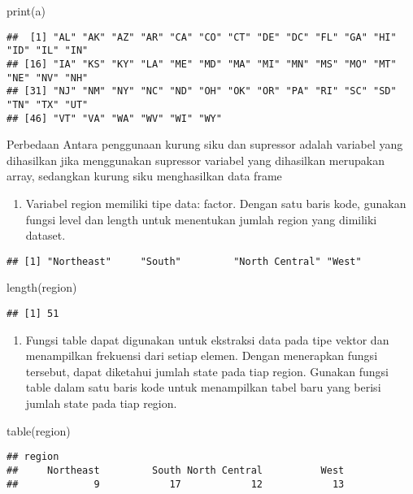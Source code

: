\documentclass[
]{article}
\newenvironment{Shaded}{\begin{snugshade}}{\end{snugshade}}
\newcommand{\FunctionTok}[1]{\textcolor[rgb]{0.00,0.00,0.00}{#1}}
\newcommand{\NormalTok}[1]{#1}
\newcommand{\OtherTok}[1]{\textcolor[rgb]{0.56,0.35,0.01}{#1}}
\newcommand{\SpecialCharTok}[1]{\textcolor[rgb]{0.00,0.00,0.00}{#1}}
\providecommand{\tightlist}{%
  \setlength{\itemsep}{0pt}\setlength{\parskip}{0pt}}
\begin{document}
\begin{Shaded}
\begin{Highlighting}[]
\FunctionTok{print}\NormalTok{(a)}
\end{Highlighting}
\end{Shaded}

\begin{verbatim}
##  [1] "AL" "AK" "AZ" "AR" "CA" "CO" "CT" "DE" "DC" "FL" "GA" "HI" "ID" "IL" "IN"
## [16] "IA" "KS" "KY" "LA" "ME" "MD" "MA" "MI" "MN" "MS" "MO" "MT" "NE" "NV" "NH"
## [31] "NJ" "NM" "NY" "NC" "ND" "OH" "OK" "OR" "PA" "RI" "SC" "SD" "TN" "TX" "UT"
## [46] "VT" "VA" "WA" "WV" "WI" "WY"
\end{verbatim}

Perbedaan Antara penggunaan kurung siku dan supressor adalah variabel
yang dihasilkan jika menggunakan supressor variabel yang dihasilkan
merupakan array, sedangkan kurung siku menghasilkan data frame

\begin{enumerate}
\def\labelenumi{\arabic{enumi}.}
\setcounter{enumi}{4}
\tightlist
\item
  Variabel region memiliki tipe data: factor. Dengan satu baris kode,
  gunakan fungsi level dan length untuk menentukan jumlah region yang
  dimiliki dataset.
\end{enumerate}

\begin{Shaded}
\end{Shaded}

\begin{verbatim}
## [1] "Northeast"     "South"         "North Central" "West"
\end{verbatim}

\begin{Shaded}
\begin{Highlighting}[]
\FunctionTok{length}\NormalTok{(region)}
\end{Highlighting}
\end{Shaded}

\begin{verbatim}
## [1] 51
\end{verbatim}

\begin{enumerate}
\def\labelenumi{\arabic{enumi}.}
\setcounter{enumi}{5}
\tightlist
\item
  Fungsi table dapat digunakan untuk ekstraksi data pada tipe vektor dan
  menampilkan frekuensi dari setiap elemen. Dengan menerapkan fungsi
  tersebut, dapat diketahui jumlah state pada tiap region. Gunakan
  fungsi table dalam satu baris kode untuk menampilkan tabel baru yang
  berisi jumlah state pada tiap region.
\end{enumerate}

\begin{Shaded}
\begin{Highlighting}[]
\FunctionTok{table}\NormalTok{(region)}
\end{Highlighting}
\end{Shaded}

\begin{verbatim}
## region
##     Northeast         South North Central          West 
##             9            17            12            13
\end{verbatim}
\end{document}
